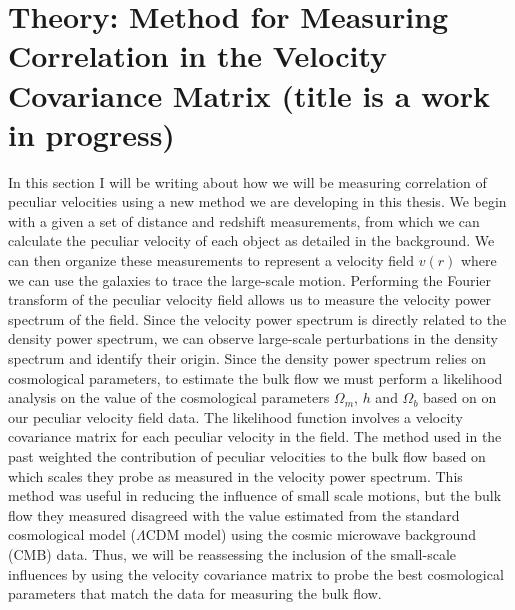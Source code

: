 \chapter{Theory: Method for Measuring Correlation in the Velocity Covariance Matrix (title is a work in progress)}

In this section I will be writing about how we will be measuring correlation of peculiar velocities using a new method we are developing in this thesis. We begin with a given a set of distance and redshift measurements, from which we can calculate the peculiar velocity of each object as detailed in the background. We can then organize these measurements to represent a velocity field $v(r)$ where we can use the galaxies to trace the large-scale motion. Performing the Fourier transform of the peculiar velocity field allows us to measure the velocity power spectrum of the field. Since the velocity power spectrum is directly related to the density power spectrum, we can observe large-scale perturbations in the density spectrum and identify their origin. Since the density power spectrum relies on cosmological parameters, to estimate the bulk flow we must perform a likelihood analysis on the value of the cosmological parameters $\Omega_m$, $h$ and $\Omega_b$ based on on our peculiar velocity field data. The likelihood function involves a velocity covariance matrix for each peculiar velocity in the field. The method used in the past weighted the contribution of peculiar velocities to the bulk flow based on which scales they probe as measured in the velocity power spectrum. This method was useful in reducing the influence of small scale motions, but the bulk flow they measured disagreed with the value estimated from the standard cosmological model ($\Lambda$CDM model) using the cosmic microwave background (CMB) data. Thus, we will be reassessing the inclusion of the small-scale influences by using the velocity covariance matrix to probe the best cosmological parameters that match the data for measuring the bulk flow.